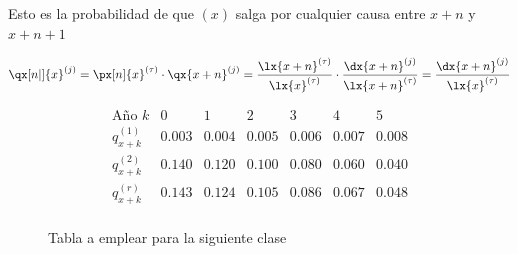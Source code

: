 \documentclass[12pt, a4paper, footinclude=true]{scrbook}
\begin{document}
	Esto es la probabilidad de que $(x)$ salga por cualquier causa entre $x+n$ y $x+n+1$ 
	
	$$\qx[n|]{x}^{(j)} = \px[n]{x}^{(\tau)} \cdot \qx{x+n}^{(j)} = \frac{\lx{x+n}^{(\tau)}}{\lx{x}^{(\tau)}} \cdot \frac{\dx{x+n}^{(j)}}{\lx{x+n}^{(\tau)}} = \frac{\dx{x+n}^{(j)}}{\lx{x}^{(\tau)}}$$
	
	\begin{figure}[h]

	\caption{Tabla a emplear para la siguiente clase}
	\[
	\begin{array}{c|cccccc}
		\text{Año } k & 0 & 1 & 2 & 3 & 4 & 5 \\
		\hline
		q^{(1)}_{x+k} & 0.003 & 0.004 & 0.005 & 0.006 & 0.007 & 0.008 \\
		q^{(2)}_{x+k} & 0.140 & 0.120 & 0.100 & 0.080 & 0.060 & 0.040 \\
		q^{(r)}_{x+k} & 0.143 & 0.124 & 0.105 & 0.086 & 0.067 & 0.048 \\
	\end{array}
	\]
	\end{figure}
	
\end{document}
